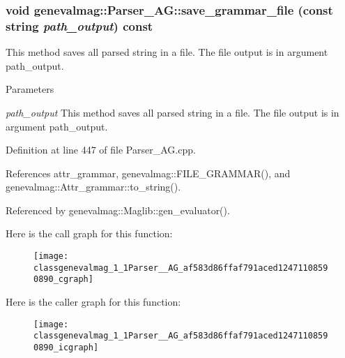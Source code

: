 \hypertarget{classgenevalmag_1_1Parser__AG_af583d86ffaf791aced12471108590890}{
\subsubsection[{save\_\-grammar\_\-file}]{\setlength{\rightskip}{0pt plus 5cm}void genevalmag::Parser\_\-AG::save\_\-grammar\_\-file (const string {\em path\_\-output}) const}}
\label{classgenevalmag_1_1Parser__AG_af583d86ffaf791aced12471108590890}
This method saves all parsed string in a file. The file output is in argument path\_\-output. 
\begin{DoxyParams}{Parameters}
\item[{\em path\_\-output}]This method saves all parsed string in a file. The file output is in argument path\_\-output. \end{DoxyParams}


Definition at line 447 of file Parser\_\-AG.cpp.



References attr\_\-grammar, genevalmag::FILE\_\-GRAMMAR(), and genevalmag::Attr\_\-grammar::to\_\-string().



Referenced by genevalmag::Maglib::gen\_\-evaluator().



Here is the call graph for this function:\nopagebreak
\begin{figure}[H]
\begin{center}
\leavevmode
\texttt{[image: classgenevalmag\_1\_1Parser\_\_AG\_af583d86ffaf791aced12471108590890\_cgraph]}
\end{center}
\end{figure}




Here is the caller graph for this function:\nopagebreak
\begin{figure}[H]
\begin{center}
\leavevmode
\texttt{[image: classgenevalmag\_1\_1Parser\_\_AG\_af583d86ffaf791aced12471108590890\_icgraph]}
\end{center}
\end{figure}




